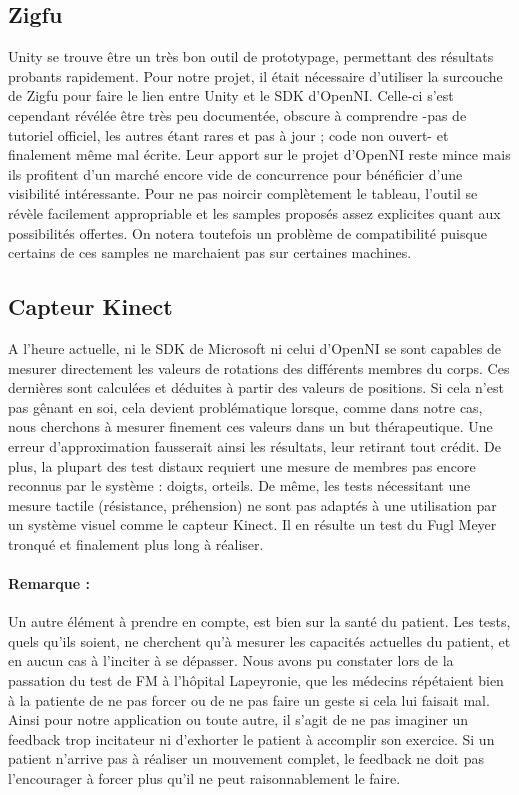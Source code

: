 \documentclass[french,12pt]{report}
\begin{document}
			\subsection{Zigfu}
Unity se trouve être un très bon outil de prototypage, permettant des résultats probants rapidement. 
Pour notre projet, il était nécessaire d'utiliser la surcouche de Zigfu pour faire le lien 
entre Unity et le SDK d'OpenNI. Celle-ci s'est cependant révélée être très peu documentée, 
obscure à comprendre -pas de tutoriel officiel, les autres étant rares et pas à jour ; 
code non ouvert- et finalement même mal écrite. Leur apport sur le projet d'OpenNI reste 
mince mais ils profitent d'un marché encore vide de concurrence pour bénéficier d'une 
visibilité intéressante. Pour ne pas noircir complètement le tableau, l'outil se 
révèle facilement appropriable et les samples proposés assez explicites quant aux
possibilités offertes. On notera toutefois un problème de compatibilité puisque 
certains de ces samples ne marchaient pas sur certaines machines.
		
		\subsection{Capteur Kinect}
A l'heure actuelle, ni le SDK de Microsoft ni celui d'OpenNI se sont capables de mesurer directement les valeurs de rotations des 
différents membres du corps. Ces dernières sont calculées et déduites à partir des valeurs de positions. Si cela n'est pas gênant en soi, cela devient problématique lorsque, comme dans notre cas, nous cherchons à mesurer finement ces valeurs dans un but thérapeutique. Une erreur d'approximation fausserait ainsi les résultats, leur retirant tout crédit.
De plus, la plupart des test distaux requiert une mesure de membres pas encore reconnus par le système : doigts, orteils.
De même, les tests nécessitant une mesure tactile (résistance, préhension) ne sont pas adaptés à une utilisation par un système visuel comme le capteur Kinect. Il en résulte un test du Fugl Meyer tronqué et finalement plus long à réaliser.

\paragraph{Remarque :\\}
Un autre élément à prendre en compte, est bien sur la santé du patient. Les tests, quels qu'ils soient, ne cherchent qu'à mesurer
les capacités actuelles du patient, et en aucun cas à l'inciter à se dépasser. Nous avons pu constater lors de la passation
du test de FM à l'hôpital Lapeyronie, que les médecins répétaient bien à la patiente de ne pas forcer ou de ne pas faire un geste
si cela lui faisait mal.\\
Ainsi pour notre application ou toute autre, il s'agit de ne pas imaginer un feedback trop incitateur ni d'exhorter le patient à 
accomplir son exercice. Si un patient n'arrive pas à réaliser un mouvement complet, le feedback ne doit pas l'encourager à forcer plus qu’il ne peut raisonnablement le faire.
		
\end{document}
